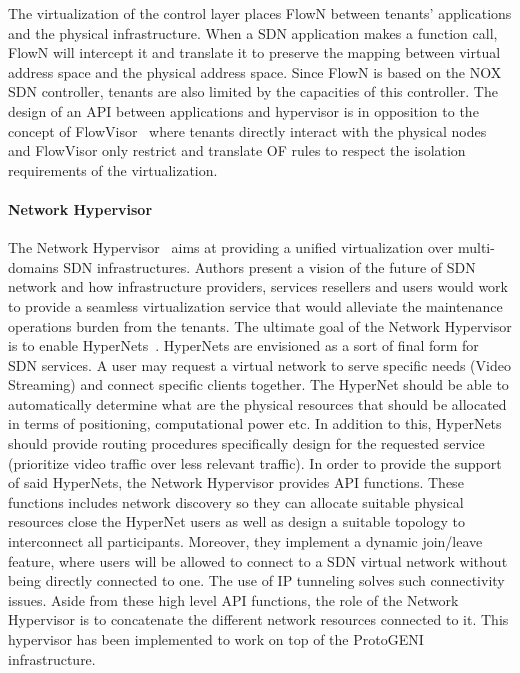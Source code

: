 The virtualization of the control layer places FlowN between tenants' applications and the physical infrastructure. When a SDN application makes a function call, FlowN will intercept it and translate it to preserve the mapping between virtual address space and the physical address space. Since FlowN is based on the NOX~\cite{nox-gude2008} SDN controller, tenants are also limited by the capacities of this controller. 
The design of an API between applications and hypervisor is in opposition to the concept of FlowVisor~\cite{FlowVisor-Sherwood2009} where tenants directly interact with the physical nodes and FlowVisor only restrict and translate OF rules to respect the isolation requirements of the virtualization.

\paragraph{Network Hypervisor}
The Network Hypervisor~\cite{NetworkHypervisor-Huang2013} aims at providing a unified virtualization over multi-domains SDN infrastructures. Authors present a vision of the future of SDN network and how infrastructure providers, services resellers and users would work to provide a seamless virtualization service that would alleviate the maintenance operations burden from the tenants.
The ultimate goal of the Network Hypervisor is to enable HyperNets~\cite{HyperNet-Huang2013a}. HyperNets are envisioned as a sort of final form for SDN services. A user may request a virtual network to serve specific needs (\eg Video Streaming) and connect specific clients together.
The HyperNet should be able to automatically determine what are the physical resources that should be allocated in terms of positioning, computational power etc. In addition to this, HyperNets should provide routing procedures specifically design for the requested service (\ie prioritize video traffic over less relevant traffic).
In order to provide the support of said HyperNets, the Network Hypervisor provides API functions. These functions includes network discovery so they can allocate suitable physical resources close the HyperNet users as well as design a suitable topology to interconnect all participants.
Moreover, they implement a dynamic join/leave feature, where users will be allowed to connect to a SDN virtual network without being directly connected to one. The use of IP tunneling solves such connectivity issues.
Aside from these high level API functions, the role of the Network Hypervisor is to concatenate the different network resources connected to it.
This hypervisor has been implemented to work on top of the ProtoGENI~\cite{protoGENI} infrastructure.


